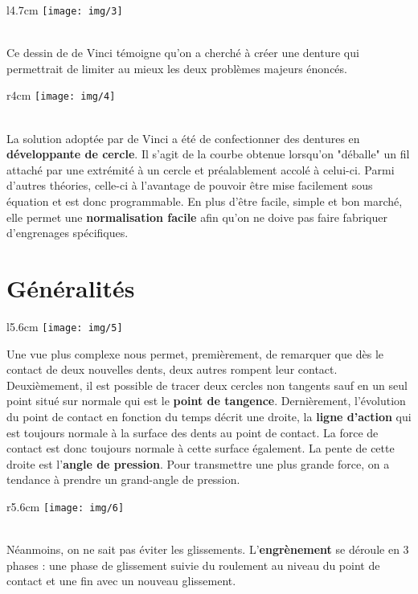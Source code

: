 	\begin{wrapfigure}[4]{l}{4.7cm}
	\texttt{[image: img/3]}
	\end{wrapfigure}	
	\ \\ Ce dessin de de Vinci témoigne qu'on a cherché à créer une denture qui permettrait de limiter au mieux les deux problèmes majeurs énoncés. \
	
	\begin{wrapfigure}[9]{r}{4cm}
	\texttt{[image: img/4]}
	\end{wrapfigure}	
	\ \\ La solution adoptée par de Vinci a été de confectionner des dentures en \textbf{développante de cercle}. Il s'agit de la courbe obtenue lorsqu'on "déballe" un fil attaché par une extrémité à un cercle et préalablement accolé à celui-ci. Parmi d'autres théories, celle-ci à l'avantage de pouvoir être mise facilement sous équation et est donc programmable. En plus d'être facile, simple et bon marché, elle permet une \textbf{normalisation facile} afin qu'on ne doive pas faire fabriquer d'engrenages spécifiques. 
	
\section{Généralités}
	\begin{wrapfigure}[8]{l}{5.6cm}
	\texttt{[image: img/5]}
	\end{wrapfigure}	
	\noindent Une vue plus complexe nous permet, premièrement, de remarquer que dès le contact de deux nouvelles dents, deux autres rompent leur contact. Deuxièmement, il est possible de tracer deux cercles non tangents sauf en un seul point situé sur normale qui est le \textbf{point de tangence}. Dernièrement, l'évolution du point de contact en fonction du temps décrit une droite, la \textbf{ligne d'action} qui est toujours normale à la surface des dents au point de contact. La force de contact est donc toujours normale à cette surface également. La pente de cette droite est l'\textbf{angle de pression}. Pour transmettre une plus grande force, on a tendance à prendre un grand-angle de pression. 
	
	\begin{wrapfigure}[5]{r}{5.6cm}
	\texttt{[image: img/6]}
	\end{wrapfigure}	
	\ \\ Néanmoins, on ne sait pas éviter les glissements. L'\textbf{engrènement} se déroule en 3 phases : une phase de glissement suivie du roulement au niveau du point de contact et une fin avec un nouveau glissement. 
	
